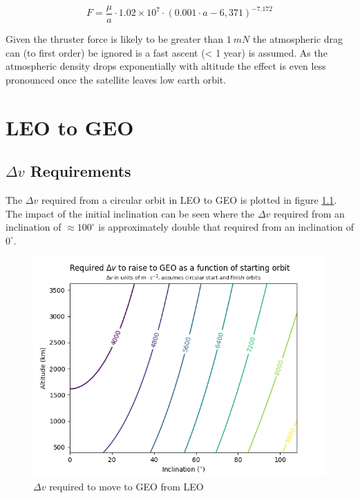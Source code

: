 \documentclass[a4paper, article, oneside, UKenglish]{memoir}
\newcommand{\0}{\mathbf{0}}
\newcommand{\1}{\mathbf{1}}
\begin{document}
\begin{equation}
F = \frac{\mu}{a} \cdot 1.02 \times 10^{7} \cdot {(0.001 \cdot a - 6,371)}^{-7.172}
\label{equ:sma_drag_force}
\end{equation}

Given the thruster force is likely to be greater than $ 1 ~ mN $ the atmospheric drag can (to first order) be ignored is a fast ascent (< 1 year) is assumed.  As the atmospheric density drops exponentially with altitude the effect is even less pronounced once the satellite leaves low earth orbit.



\chapter{LEO to GEO}

\section{$\Delta v$ Requirements}

The $ \Delta v $ required from a circular orbit in LEO to GEO is plotted in figure \ref{fig:deltav_contour}.  The impact of the initial inclination can be seen where the $ \Delta v$ required from an inclination of $\approx 100^{\circ}$ is approximately double that required from an inclination of $0^{\circ}$.

\begin{figure}[H]
    \centering
    \includegraphics[width=\textwidth]{deltav_contour}
    \caption{$\Delta v$ required to move to GEO from LEO}
    \label{fig:deltav_contour}
\end{figure}
\end{document}
